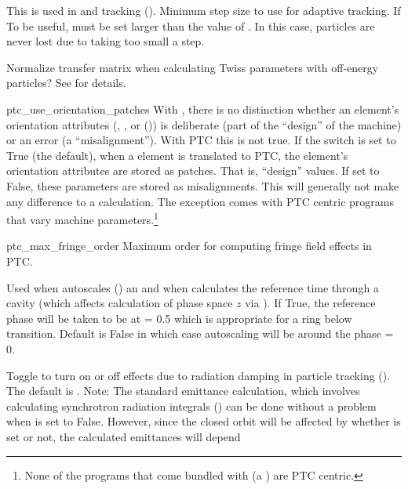 {\begin{description}
%
\item[] \Newline
This is used in  and  tracking (). Minimum step
size to use for adaptive tracking. If To be useful,  must be set
larger than the value of . In this case, particles are never lost
due to taking too small a step.
%
\item[] \Newline
Normalize transfer matrix when calculating Twiss parameters with off-energy particles?
See  for details.
%
\item{ptc_use_orientation_patches} \Newline
With \bmad, there is no distinction whether an element's orientation attributes (,
, or  ()) is deliberate (part of the ``design'' of the machine)
or an error (a ``misalignment'').  With PTC this is not true. If the 
switch is set to True (the default), when a \bmad element is translated to PTC,
the element's orientation attributes are stored as patches. That is, ``design'' values.
If set to False, these parameters are stored as misalignments. This will generally not make any
difference to a calculation. The exception comes with PTC centric programs that vary machine
parameters.\footnote
  {
None of the programs that come bundled with \bmad (a \bmad {}) are
PTC centric.
  }
%
\item{ptc_max_fringe_order} \Newline
Maximum order for computing fringe field effects in PTC. 
%
\item[\vn{rf_phase_below_transition_ref}] \Newline
Used when \bmad autoscales () an  and when \bmad calculates the
reference time through a cavity (which affects calculation of phase space $z$ via ).  If
True, the reference phase will be taken to be at  = 0.5 which is appropriate for a ring
below transition. Default is False in which case autoscaling will be around the phase  = 0.
%
\item[\vn{radiation_damping_on}] \Newline
Toggle to turn on or off effects due to radiation damping in particle tracking
(). The default is . Note: The standard \bmad emittance calculation,
which involves calculating synchrotron radiation integrals () can be done without
a problem when  is set to False. However, since the closed orbit will be
affected by whether  is set or not, the calculated emittances will depend

\end{description}}
